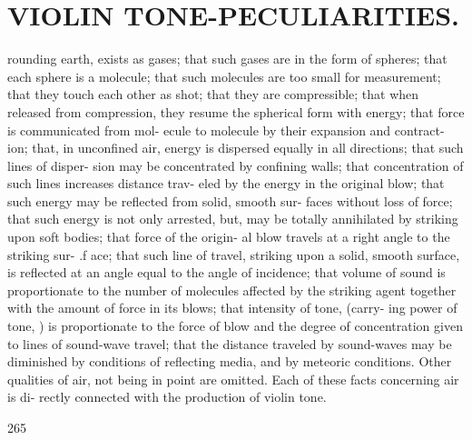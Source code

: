 \documentclass{article}
\begin{document}
\section*{VIOLIN TONE-PECULIARITIES.}
rounding earth, exists as gases; that such gases are in the form of spheres; that each sphere is a molecule; that such molecules are too small for measurement; that they touch each other as shot; that they are compressible; that when released from compression, they resume the spherical form with energy; that force is communicated from mol- ecule to molecule by their expansion and contract- ion; that, in unconfined air, energy is dispersed equally in all directions; that such lines of disper- sion may be concentrated by confining walls; that concentration of such lines increases distance trav- eled by the energy in the original blow; that such energy may be reflected from solid, smooth sur- faces without loss of force; that such energy is not only arrested, but, may be totally annihilated by striking upon soft bodies; that force of the origin- al blow travels at a right angle to the striking sur- .f ace; that such line of travel, striking upon a solid, smooth surface, is reflected at an angle equal to the angle of incidence; that volume of sound is proportionate to the number of molecules affected by the striking agent together with the amount of force in its blows; that intensity of tone, (carry- ing power of tone, ) is proportionate to the force of blow and the degree of concentration given to lines of sound-wave travel; that the distance traveled by sound-waves may be diminished by conditions of reflecting media, and by meteoric conditions. Other qualities of air, not being in point are omitted. Each of these facts concerning air is di- rectly connected with the production of violin tone.

265
\end{document}
